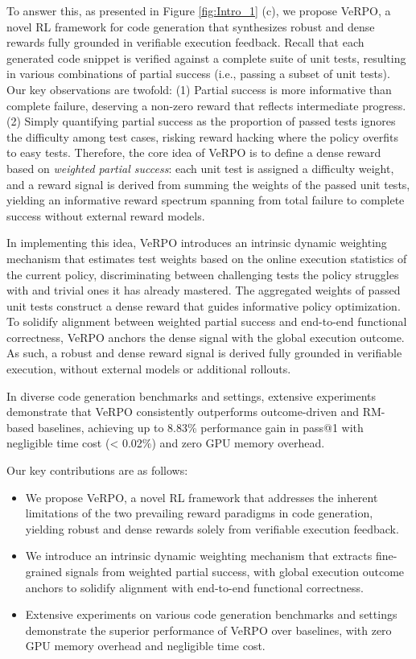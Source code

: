 \documentclass[11pt]{article}
\begin{document}
To answer this, as presented in Figure \ref{fig:Intro_1} (c), we propose VeRPO, a novel RL framework for code generation that synthesizes robust and dense rewards fully grounded in verifiable execution feedback. Recall that each generated code snippet is verified against a complete suite of unit tests, resulting in various combinations of partial success (i.e., passing a subset of unit tests). Our key observations are twofold: (1) Partial success is more informative than complete failure, deserving a non-zero reward that reflects intermediate progress. (2) Simply quantifying partial success as the proportion of passed tests ignores the difficulty among test cases, risking reward hacking where the policy overfits to easy tests. Therefore, the core idea of VeRPO is to define a dense reward based on \textit{weighted partial success}: each unit test is assigned a difficulty weight, and a reward signal is derived from summing the weights of the passed unit tests, yielding an informative reward spectrum spanning from total failure to complete success without external reward models. 

In implementing this idea, VeRPO introduces an intrinsic dynamic weighting mechanism that estimates test weights based on the online execution statistics of the current policy, discriminating between challenging tests the policy struggles with and trivial ones it has already mastered. The aggregated weights of passed unit tests construct a dense reward that guides informative policy optimization. To solidify alignment between weighted partial success and end-to-end functional correctness, VeRPO anchors the dense signal with the global execution outcome. As such, a robust and dense reward signal is derived fully grounded in verifiable execution, without external models or additional rollouts.

In diverse code generation benchmarks and settings, extensive experiments demonstrate that VeRPO consistently outperforms outcome-driven and RM-based baselines, achieving up to 8.83\% performance gain in pass@1 with negligible time cost (< 0.02\%) and zero GPU memory overhead.

Our key contributions are as follows:
\begin{itemize}
\item We propose VeRPO, a novel RL framework that addresses the inherent limitations of the two prevailing reward paradigms in code generation, yielding robust and dense rewards solely from verifiable execution feedback.
\item We introduce an intrinsic dynamic weighting mechanism that extracts fine-grained signals from weighted partial success, with global execution outcome anchors to solidify alignment with end-to-end functional correctness.
\item Extensive experiments on various code generation benchmarks and settings demonstrate the superior performance of VeRPO over baselines, with zero GPU memory overhead and negligible time cost.
\end{itemize}
\end{document}
